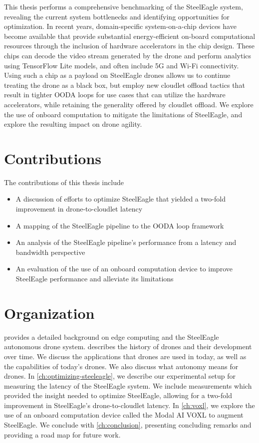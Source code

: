 This thesis performs a comprehensive benchmarking of the SteelEagle system,
revealing the current system bottlenecks and identifying opportunities for
optimization. In recent years, domain-specific system-on-a-chip devices have
become available that provide substantial energy-efficient on-board
computational resources through the inclusion of hardware accelerators in the
chip design. These chips can decode the video stream generated by the drone and
perform analytics using TensorFlow Lite models, and often include 5G and Wi-Fi
connectivity. Using such a chip as a payload on SteelEagle drones allows us to
continue treating the drone as a black box, but employ new cloudlet offload
tactics that result in tighter OODA loops for use cases that can utilize the
hardware accelerators, while retaining the generality offered by cloudlet
offload. We explore the use of onboard computation to mitigate the limitations
of SteelEagle, and explore the resulting impact on drone agility.

\section{Contributions}

The contributions of this thesis include
\begin{itemize}
  \item A discussion of efforts to optimize SteelEagle that yielded a two-fold
      improvement in drone-to-cloudlet latency
  \item A mapping of the SteelEagle pipeline to the OODA loop framework
  \item An analysis of the SteelEagle pipeline's performance from a latency
      and bandwidth perspective
  \item An evaluation of the use of an onboard computation device to improve
      SteelEagle performance and alleviate its limitations
\end{itemize}

\section{Organization}
 provides a detailed background on edge computing and the
SteelEagle autonomous drone system.  describes the history
of drones and their development over time. We discuss the applications that
drones are used in today, as well as the capabilities of today's drones.  We
also discuss what autonomy means for drones. In
\cref{ch:optimizing-steeleagle}, we describe our experimental setup for
measuring the latency of the SteelEagle system. We include measurements which
provided the insight needed to optimize SteelEagle, allowing for a two-fold
improvement in SteelEagle's drone-to-cloudlet latency. In \cref{ch:voxl}, we
explore the use of an onboard computation device called the Modal AI VOXL to
augment SteelEagle. We conclude with \cref{ch:conclusion}, presenting
concluding remarks and providing a road map for future work.


